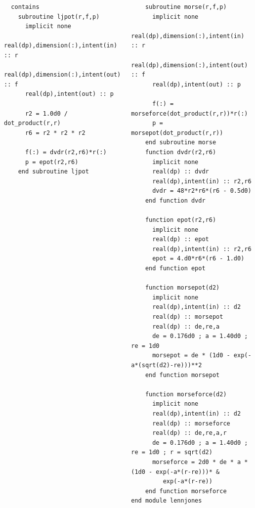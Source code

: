\documentclass[slidestop,mathserif,compress,xcolor=svgnames]{beamer}
\newenvironment{eblock}[0]
{
\begin{beamerboxesrounded}[upper=uppercol2,lower=lowercol2,shadow=true]}
{\end{beamerboxesrounded}}
\begin{document}
\begin{frame}
{\begin{columns}
\begin{eblock}{}
\begin{verbatim}
  contains 
    subroutine ljpot(r,f,p)
      implicit none
      real(dp),dimension(:),intent(in) :: r
      real(dp),dimension(:),intent(out) :: f
      real(dp),intent(out) :: p

      r2 = 1.0d0 / dot_product(r,r) 
      r6 = r2 * r2 * r2
      
      f(:) = dvdr(r2,r6)*r(:)
      p = epot(r2,r6)      
    end subroutine ljpot
        \end{verbatim}
      \end{eblock}
      \column{5.5cm}
      \vspace{-0.5cm}
      \begin{eblock}{}
        \begin{verbatim}
    subroutine morse(r,f,p)
      implicit none
      real(dp),dimension(:),intent(in) :: r
      real(dp),dimension(:),intent(out) :: f
      real(dp),intent(out) :: p

      f(:) = morseforce(dot_product(r,r))*r(:)
      p = morsepot(dot_product(r,r))
    end subroutine morse
    function dvdr(r2,r6) 
      implicit none
      real(dp) :: dvdr
      real(dp),intent(in) :: r2,r6
      dvdr = 48*r2*r6*(r6 - 0.5d0)
    end function dvdr

    function epot(r2,r6)
      implicit none
      real(dp) :: epot
      real(dp),intent(in) :: r2,r6      
      epot = 4.d0*r6*(r6 - 1.d0)
    end function epot

    function morsepot(d2)
      implicit none
      real(dp),intent(in) :: d2
      real(dp) :: morsepot
      real(dp) :: de,re,a
      de = 0.176d0 ; a = 1.40d0 ; re = 1d0
      morsepot = de * (1d0 - exp(-a*(sqrt(d2)-re)))**2
    end function morsepot

    function morseforce(d2)
      implicit none
      real(dp),intent(in) :: d2
      real(dp) :: morseforce
      real(dp) :: de,re,a,r
      de = 0.176d0 ; a = 1.40d0 ; re = 1d0 ; r = sqrt(d2)
      morseforce = 2d0 * de * a * (1d0 - exp(-a*(r-re)))* &
         exp(-a*(r-re))
    end function morseforce
end module lennjones
        \end{verbatim}
      \end{eblock}
    \end{columns}
  }


\end{frame}
\end{document}
